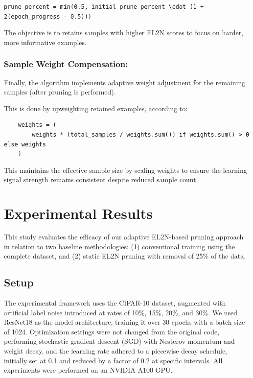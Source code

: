 \documentclass{article}
\begin{document}
\begin{verbatim}
prune_percent = min(0.5, initial_prune_percent \cdot (1 + 2(epoch_progress - 0.5)))
\end{verbatim}

The objective is to retains samples with higher EL2N scores to focus on harder, more informative examples.

\subsubsection{Sample Weight Compensation:}
Finally, the algorithm implements adaptive weight adjustment for the remaining samples (after pruning is performed). 

This is done by upweighting retained examples, according to: 
\begin{verbatim}
    weights = (
        weights * (total_samples / weights.sum()) if weights.sum() > 0 else weights
    )
\end{verbatim}

This maintains the effective sample size by scaling weights to ensure the learning signal strength remains consistent despite reduced sample count.
    
\section{Experimental Results}

This study evaluates the efficacy of our adaptive EL2N-based pruning approach in relation to two baseline methodologies: (1) conventional training using the complete dataset, and (2) static EL2N pruning with removal of 25\% of the data. 

\subsection{Setup}

The experimental framework uses the CIFAR-10 dataset, augmented with artificial label noise introduced at rates of 10\%, 15\%, 20\%, and 30\%. We used ResNet18 as the model architecture, training it over 30 epochs with a batch size of 1024. Optimization settings were not changed from the original code, performing stochastic gradient descent (SGD) with Nesterov momentum and weight decay, and the learning rate adhered to a piecewise decay schedule, initially set at 0.1 and reduced by a factor of 0.2 at specific intervals. All experiments were performed on an NVIDIA A100 GPU.
\end{document}
